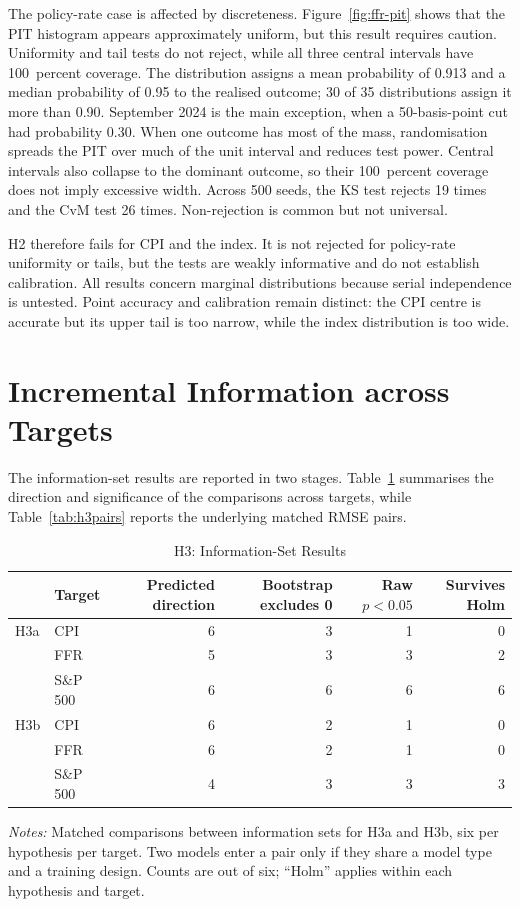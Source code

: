 \documentclass[12pt,a4paper]{report}
\newcommand{\tablenote}[1]{%
  \par\vspace{0.4em}%
  \begin{minipage}{0.9\textwidth}%
  \footnotesize\raggedright\emph{Notes:} #1%
  \end{minipage}%
}
\begin{document}
The policy-rate case is affected by discreteness. Figure~\ref{fig:ffr-pit}
shows that the PIT histogram appears approximately uniform, but this result
requires caution. Uniformity and tail tests do not reject, while all three
central intervals have 100~percent coverage. The distribution assigns a mean
probability of 0.913 and a median probability of 0.95 to the realised outcome;
30 of 35 distributions assign it more than 0.90. September 2024 is the main
exception, when a 50-basis-point cut had probability 0.30. When one outcome has
most of the mass, randomisation spreads the PIT over much of the unit interval
and reduces test power. Central intervals also collapse to the dominant
outcome, so their 100~percent
coverage does not imply excessive width. Across 500 seeds, the KS test rejects
19 times and the CvM test 26 times. Non-rejection is common but not universal.

H2 therefore fails for CPI and the index. It is not rejected for policy-rate
uniformity or tails, but the tests are weakly informative and do not establish
calibration. All results concern marginal distributions because serial
independence is untested. Point accuracy and calibration remain distinct: the
CPI centre is accurate but its upper tail is too narrow, while the index
distribution is too wide.

\section{Incremental Information across Targets}
\label{sec:results-h3}

The information-set results are reported in two stages. Table~\ref{tab:h3}
summarises the direction and significance of the comparisons across targets,
while Table~\ref{tab:h3pairs} reports the underlying matched RMSE pairs.

\begin{table}[H]
\centering
\caption{H3: Information-Set Results}
\label{tab:h3}
\small
\begin{tabular}{@{}llrrrr@{}}
\toprule
 & Target & Predicted direction & Bootstrap excludes 0 & Raw $p<0.05$ & Survives Holm \\
\midrule
H3a & CPI & 6 & 3 & 1 & 0 \\
 & FFR & 5 & 3 & 3 & 2 \\
 & S\&P 500 & 6 & 6 & 6 & 6 \\
\midrule
H3b & CPI & 6 & 2 & 1 & 0 \\
 & FFR & 6 & 2 & 1 & 0 \\
 & S\&P 500 & 4 & 3 & 3 & 3 \\
\bottomrule
\end{tabular}
\tablenote{Matched comparisons between information sets for H3a and H3b, six
per hypothesis per target. Two models enter a pair only if they share a model
type and a training design. Counts are out of six; ``Holm'' applies within
each hypothesis and target.}
\end{table}
\end{document}
